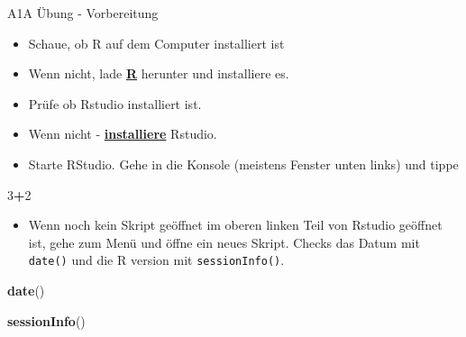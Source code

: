 \documentclass[ignorenonframetext,]{beamer}
\newenvironment{Shaded}{\begin{snugshade}}{\end{snugshade}}
\newcommand{\DecValTok}[1]{\textcolor[rgb]{0.00,0.00,0.81}{#1}}
\newcommand{\KeywordTok}[1]{\textcolor[rgb]{0.13,0.29,0.53}{\textbf{#1}}}
\newcommand{\NormalTok}[1]{#1}
\newcommand{\OperatorTok}[1]{\textcolor[rgb]{0.81,0.36,0.00}{\textbf{#1}}}
\providecommand{\tightlist}{%
  \setlength{\itemsep}{0pt}\setlength{\parskip}{0pt}}
\begin{document}
\begin{frame}[fragile]{A1A Übung - Vorbereitung}
\protect\hypertarget{a1a-ubung---vorbereitung}{}

\begin{itemize}
\tightlist
\item
  Schaue, ob R auf dem Computer installiert ist
\item
  Wenn nicht, lade \href{r-project.org}{\textbf{R}} herunter und
  installiere es.
\item
  Prüfe ob Rstudio installiert ist.
\item
  Wenn nicht - \href{http://www.rstudio.com/}{\textbf{installiere}}
  Rstudio.
\item
  Starte RStudio. Gehe in die Konsole (meistens Fenster unten links) und
  tippe
\end{itemize}

\begin{Shaded}
\begin{Highlighting}[]
\DecValTok{3}\OperatorTok{+}\DecValTok{2}
\end{Highlighting}
\end{Shaded}

\begin{itemize}
\tightlist
\item
  Wenn noch kein Skript geöffnet im oberen linken Teil von Rstudio
  geöffnet ist, gehe zum Menü und öffne ein neues Skript. Checks das
  Datum mit \texttt{date()} und die R version mit
  \texttt{sessionInfo()}.
\end{itemize}

\begin{Shaded}
\begin{Highlighting}[]
\KeywordTok{date}\NormalTok{()}
\end{Highlighting}
\end{Shaded}

\begin{Shaded}
\begin{Highlighting}[]
\KeywordTok{sessionInfo}\NormalTok{()}
\end{Highlighting}
\end{Shaded}

\end{frame}
\end{document}
